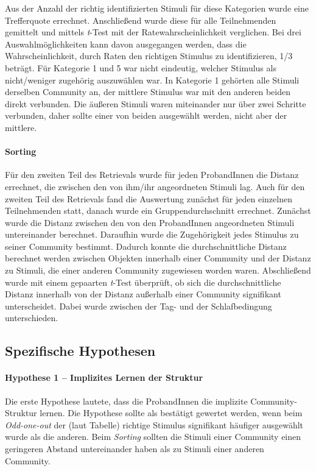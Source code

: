 Aus der Anzahl der richtig identifizierten Stimuli für diese Kategorien wurde eine Trefferquote errechnet. Anschließend wurde diese für alle Teilnehmenden gemittelt und mittels \textit{t}-Test mit der Ratewahrscheinlichkeit verglichen. Bei drei Auswahlmöglichkeiten kann davon ausgegangen werden, dass die Wahrscheinlichkeit, durch Raten den richtigen Stimulus zu identifizieren, 1/3 beträgt.
Für Kategorie 1 und 5 war nicht eindeutig, welcher Stimulus als nicht/weniger zugehörig auszuwählen war. In Kategorie 1 gehörten alle Stimuli derselben Community an, der mittlere Stimulus war mit den anderen beiden direkt verbunden. Die äußeren Stimuli waren miteinander nur über zwei Schritte verbunden, daher sollte einer von beiden ausgewählt werden, nicht aber der mittlere.


\paragraph{Sorting}
Für den zweiten Teil des Retrievals wurde für jeden ProbandInnen die Distanz errechnet, die zwischen den von ihm/ihr angeordneten Stimuli lag.
Auch für den zweiten Teil des Retrievals fand die Auswertung zunächst für jeden einzelnen Teilnehmenden statt, danach wurde ein Gruppendurchschnitt errechnet. Zunächst wurde die Distanz zwischen den von den ProbandInnen angeordneten Stimuli untereinander berechnet. Daraufhin wurde die Zugehörigkeit jedes Stimulus zu seiner Community bestimmt. Dadurch konnte die durchschnittliche Distanz berechnet werden zwischen Objekten innerhalb einer Community und der Distanz zu Stimuli, die einer anderen Community zugewiesen worden waren. Abschließend wurde mit einem gepaarten \textit{t}-Test überprüft, ob sich die durchschnittliche Distanz innerhalb von der Distanz außerhalb einer Community signifikant unterscheidet. Dabei wurde zwischen der Tag- und der Schlafbedingung unterschieden.

\subsection{Spezifische Hypothesen}

\paragraph{Hypothese 1 – Implizites Lernen der Struktur}
Die erste Hypothese lautete, dass die ProbandInnen die implizite Community-Struktur lernen.
Die Hypothese sollte als bestätigt gewertet werden, wenn beim \textit{Odd-one-out} der (laut Tabelle) richtige Stimulus signifikant häufiger ausgewählt wurde als die anderen. Beim \textit{Sorting} sollten die Stimuli einer Community einen geringeren Abstand untereinander haben als zu Stimuli einer anderen Community.

